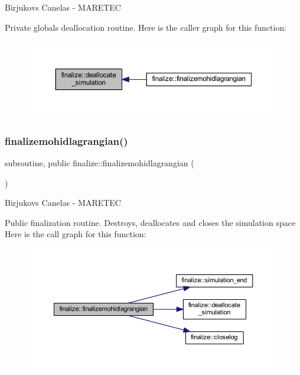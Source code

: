 Birjukovs Canelas -\/ M\+A\+R\+E\+T\+EC 

Private globals deallocation routine. Here is the caller graph for this function\+:\nopagebreak
\begin{figure}[H]
\begin{center}
\leavevmode
\includegraphics[width=350pt]{namespacefinalize_a2b6733e6db5a768ac96ad9274685ad43_icgraph}
\end{center}
\end{figure}
\mbox{\label{namespacefinalize_a57aceaa0eb3b16c1942dd2cb013010e4}} 
\subsubsection{\texorpdfstring{finalizemohidlagrangian()}{finalizemohidlagrangian()}}
{\footnotesize\ttfamily subroutine, public finalize\+::finalizemohidlagrangian (\begin{DoxyParamCaption}{ }\end{DoxyParamCaption})}



Birjukovs Canelas -\/ M\+A\+R\+E\+T\+EC 

Public finalization routine. Destroys, deallocates and closes the simulation space Here is the call graph for this function\+:\nopagebreak
\begin{figure}[H]
\begin{center}
\leavevmode
\includegraphics[width=350pt]{namespacefinalize_a57aceaa0eb3b16c1942dd2cb013010e4_cgraph}
\end{center}
\end{figure}
\mbox{\label{namespacefinalize_a57fbc96712f416103b529ff969479250}} 
